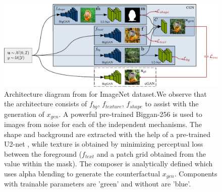
\begin{figure}[H]
  \centering
  \includegraphics[width=0.9\linewidth]{../openreview/images/arch_diagram.pdf}
  \caption{Architecture diagram from \cite{sauer2021counterfactual} for ImageNet \cite{imagenet} dataset.We observe that the architecture consists of $f_{bg}$, $f_{texture}$, $f_{shape}$ to assist with the generation of $x_{gen}$. A powerful pre-trained Biggan-256 \cite{brock2019large} is used to images from noise for each of the independent mechanisms. The shape and background are extracted with the help of a pre-trained U2-net \cite{qin2020u2}, while texture is obtained by minimizing perceptual loss between the foreground ($f_{text}$ and a patch grid obtained from the value within the mask). The composer is analytically defined which uses alpha blending to generate the counterfactual $x_{gen}$. Components with trainable parameters are 'green' and without are 'blue'. 
  }
  \label{fig:arch_diagram}
\end{figure}




